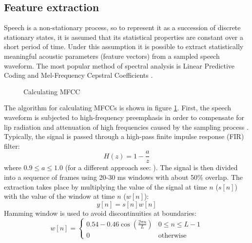 \subsection{Feature extraction}
Speech is a non-stationary process, so to represent it as a succession of discrete stationary states, it is assumed that its statistical properties are constant over a short period of time. Under this assumption it is possible to extract statistically meaningful acoustic parameters (feature vectors) from a sampled speech waveform. The most popular method of spectral analysis is Linear Predictive Coding  and Mel-Frequency Cepstral Coefficients . 
\begin{figure}[!ht]
  \label{figure:mfcc}
  \centering
  \caption{Calculating MFCC}
\end{figure}

The algorithm for calculating MFCCs is shown in figure \ref{figure:mfcc}. First, the speech waveform is subjected to high-frequency preemphasis in order to compensate for lip radiation and attenuation of high frequencies caused by the sampling process \cite{singh2012preprocessing}. Typically, the signal is passed through a high-pass finite impulse response (FIR)  filter:
\begin{equation}
H(z)=1-\frac{a}{z}
\end{equation}
where $0.9 \leq a \leq 1.0$ (for a different approach see: \cite{nossair1995signal}). The signal is then divided into a sequence of frames using 20-30 ms windows with about 50\% overlap. The extraction takes place by multiplying the value of the signal at time $n$ ($s[n]$) with the value of the window at time $n$ ($w[n]$):
\begin{equation}
  y[n]=s[n]w[n]
\end{equation}
Hamming window is used to avoid discontinuities at boundaries:
\begin{equation}
\label{equation:hamming}
  w[n]=
  \begin{cases}
    0.54-0.46\cos(\frac{2 \pi n}{L}) & 0 \leq n \leq L-1 \\
    0                               & \text{otherwise}
  \end{cases}
\end{equation}

